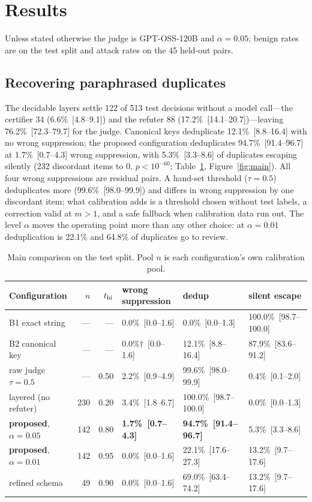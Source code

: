 \section{Results}\label{sec:results}

Unless stated otherwise the judge is GPT-OSS-120B and $\alpha=0.05$; benign rates are on the test split and attack rates on the 45 held-out pairs.

\subsection{Recovering paraphrased duplicates}\label{sec:res-main}

The decidable layers settle 122 of 513 test decisions without a model call---the certifier 34 (6.6\%~[4.8--9.1]) and the refuter 88 (17.2\%~[14.1--20.7])---leaving 76.2\%~[72.3--79.7] for the judge. Canonical keys deduplicate 12.1\%~[8.8--16.4] with no wrong suppression; the proposed configuration deduplicates 94.7\%~[91.4--96.7] at 1.7\%~[0.7--4.3] wrong suppression, with 5.3\%~[3.3--8.6] of duplicates escaping silently (232 discordant items to 0, $p<10^{-60}$; Table~\ref{tab:main}, Figure~\ref{fig:main}). All four wrong suppressions are residual pairs. A hand-set threshold ($\tau=0.5$) deduplicates more (99.6\%~[98.0--99.9]) and differs in wrong suppression by one discordant item; what calibration adds is a threshold chosen without test labels, a correction valid at $m>1$, and a safe fallback when calibration data run out. The level $\alpha$ moves the operating point more than any other choice: at $\alpha=0.01$ deduplication is 22.1\% and 64.8\% of duplicates go to review.

\begin{table}[t]
\centering\small\setlength{\tabcolsep}{4pt}
\caption{Main comparison on the test split. Pool $n$ is each configuration's own calibration pool.}\label{tab:main}
\begin{tabular}{@{}lrrlll@{}}
\toprule
Configuration & $n$ & $t_{\mathrm{hi}}$ & wrong suppression & dedup & silent escape \\
\midrule
B1 exact string & --- & --- & 0.0\%~[0.0--1.6] & 0.0\%~[0.0--1.3] & 100.0\%~[98.7--100.0] \\
B2 canonical key & --- & --- & 0.0\%$\dagger$~[0.0--1.6] & 12.1\%~[8.8--16.4] & 87.9\%~[83.6--91.2] \\
raw judge $\tau=0.5$ & --- & 0.50 & 2.2\%~[0.9--4.9] & 99.6\%~[98.0--99.9] & 0.4\%~[0.1--2.0] \\
layered (no refuter) & 230 & 0.20 & 3.4\%~[1.8--6.7] & 100.0\%~[98.7--100.0] & 0.0\%~[0.0--1.3] \\
\textbf{proposed}, $\alpha=0.05$ & 142 & 0.80 & \textbf{1.7\%~[0.7--4.3]} & \textbf{94.7\%~[91.4--96.7]} & 5.3\%~[3.3--8.6] \\
\textbf{proposed}, $\alpha=0.01$ & 142 & 0.95 & 0.0\%~[0.0--1.6] & 22.1\%~[17.6--27.3] & 13.2\%~[9.7--17.6] \\
refined schema & 49 & 0.90 & 0.0\%~[0.0--1.6] & 69.0\%~[63.4--74.2] & 13.2\%~[9.7--17.6] \\
\bottomrule
\end{tabular}
\end{table}

